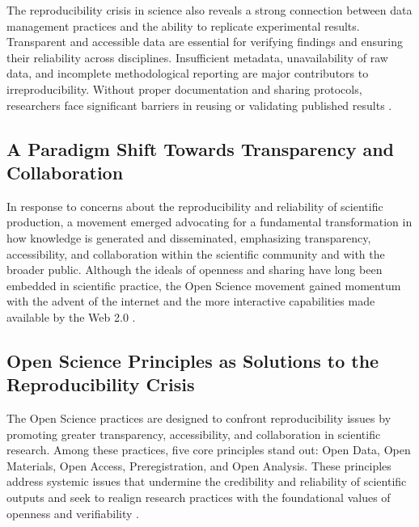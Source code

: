 \documentclass{article}
\begin{document}
The reproducibility crisis in science also reveals a strong connection between data management practices and the ability to replicate experimental results. Transparent and accessible data are essential for verifying findings and ensuring their reliability across disciplines. Insufficient metadata, unavailability of raw data, and incomplete methodological reporting are major contributors to irreproducibility. Without proper documentation and sharing protocols, researchers face significant barriers in reusing or validating published results \cite{samuel_understanding_2021}.

\subsection{A Paradigm Shift Towards Transparency and Collaboration}

In response to concerns about the reproducibility and reliability of scientific production, a movement emerged advocating for a fundamental transformation in how knowledge is generated and disseminated, emphasizing transparency, accessibility, and collaboration within the scientific community and with the broader public. Although the ideals of openness and sharing have long been embedded in scientific practice, the Open Science movement gained momentum with the advent of the internet and the more interactive capabilities made available by the Web 2.0 \cite{thibault_open_2023}.

\subsection{Open Science Principles as Solutions to the Reproducibility Crisis}

The Open Science practices are designed to confront reproducibility issues by promoting greater transparency, accessibility, and collaboration in scientific research. Among these practices, five core principles stand out: Open Data, Open Materials, Open Access, Preregistration, and Open Analysis. These principles address systemic issues that undermine the credibility and reliability of scientific outputs and seek to realign research practices with the foundational values of openness and verifiability \cite{van_dijk_open_2021}.
\end{document}
